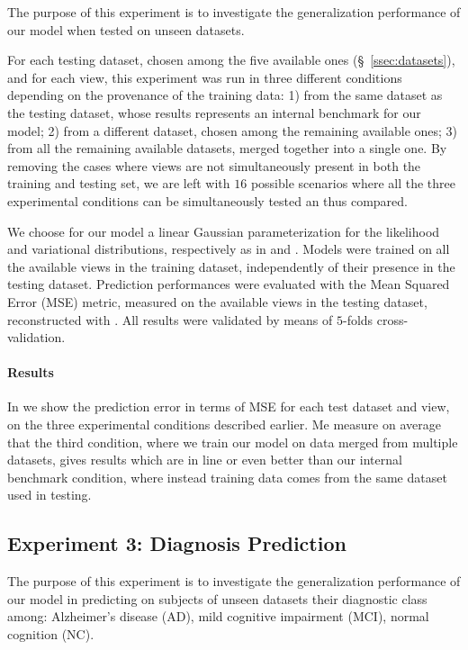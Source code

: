 The purpose of this experiment is to investigate the generalization performance of our model when tested on unseen datasets.

For each testing dataset, chosen among the five available ones (\S~\ref{ssec:datasets}), and for each view, this experiment was run in three different conditions depending on the provenance of the training data:
1) from the same dataset as the testing dataset, whose results represents an internal benchmark for our model;
2) from a different dataset, chosen among the remaining available ones;
3) from all the remaining available datasets, merged together into a single one.
By removing the cases where views are not simultaneously present in both the training and testing set,
we are left with $16$ possible scenarios where all the three experimental conditions can be simultaneously tested an thus compared.

We choose for our model a linear Gaussian parameterization for the likelihood and variational distributions, respectively as in  and .
Models were trained on all the available views in the training dataset, independently of their presence in the testing dataset.
Prediction performances were evaluated with the Mean Squared Error (MSE) metric, measured on the available views in the testing dataset, reconstructed with .
All results were validated by means of $5$-folds cross-validation.

\paragraph{Results}
In  we show the prediction error in terms of MSE for each test dataset and view, on the three experimental conditions described earlier.
Me measure on average that the third condition, where we train our model on data merged from multiple datasets, gives results which are in line or even better than our internal benchmark condition, where instead training data comes from the same dataset used in testing.

\subsection{Experiment 3: Diagnosis Prediction}



The purpose of this experiment is to investigate the generalization performance of our model in predicting on subjects of unseen datasets their diagnostic class among:
Alzheimer's disease (AD),
mild cognitive impairment (MCI),
normal cognition (NC).

